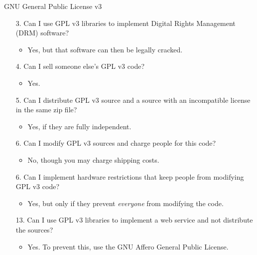 \documentclass{beamer}
\begin{document}
\begin{frame}{GNU General Public License v3 \hfill\href{http://www.gnu.org/copyleft/gpl.html}{}}
\begin{itemize}
\item[3.] Can I use GPL v3 libraries to implement Digital Rights Management (DRM) software? \\
\begin{itemize}
\item<2->Yes, but that software can then be legally cracked.
\end{itemize}
\item[4.] Can I sell someone else's GPL v3 code?
\begin{itemize}
\item<2->Yes.
\end{itemize}
\item[5.] Can I distribute GPL v3 source and a source with an incompatible license in the same zip file?
\begin{itemize}
\item<2->Yes, if they are fully independent.
\end{itemize}
\item[6.] Can I modify GPL v3 sources and charge people for this code?
\begin{itemize}
\item<2-> No, though you may charge shipping costs.
\end{itemize}
\item[6.] Can I implement hardware restrictions that keep people from modifying GPL v3 code?
\begin{itemize}
\item<2-> Yes, but only if they prevent \emph{everyone} from modifying the code.
\end{itemize}
\item[13.] Can I use GPL v3 libraries to implement a web service and not distribute the sources?
\begin{itemize}
\item<2-> Yes. To prevent this, use the GNU Affero General Public License.
\end{itemize}
\end{itemize}
\end{frame}
\end{document}
